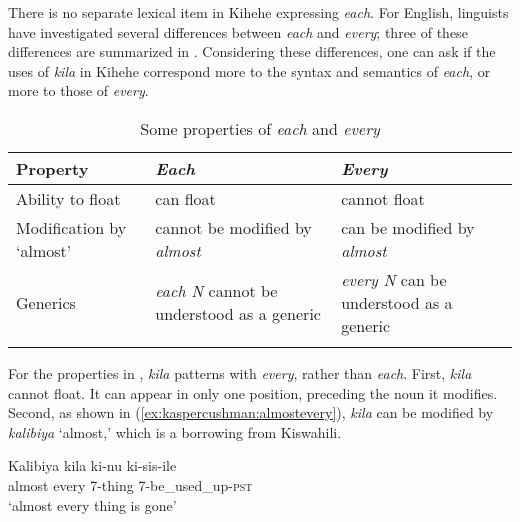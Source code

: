 \documentclass[output=paper,modfonts,nonflat]{langsci/langscibook}
\begin{document}
There is no separate lexical item in Kihehe expressing \textit{each}. For English, linguists have investigated several differences between \textit{each} and \textit{every}; three of these differences are summarized in . Considering these differences, one can ask if the uses of \textit{kila} in Kihehe correspond more to the syntax and semantics of \textit{each}, or more to those of \textit{every}. 

\begin{table}
\small
\caption{Some properties of \emph{each} and \emph{every} \citep{BeghelliStowell1997}}
\label{tab:kaspercushman:everyeach}
\begin{tabularx}{\textwidth}{l@{~~}p{42mm}@{~~}Q@{}}
\lsptoprule
Property                 & \textit{Each}                                                                                            & \textit{Every}                                                                                                 \\ 
\midrule
Ability to float         & can float                                                 & cannot float                                                                                          \\ 
Modification by `almost'  & cannot be modified by \textit{almost}                     & can be modified by \textit{almost}                                                                           \\ 
Generics                 & \textit{each N} cannot be understood as a generic          & \textit{every N} can be understood as a   generic                  \\ 
\lspbottomrule
\end{tabularx}
\end{table}

For the properties in , \textit{kila} patterns with \textit{every}, rather than \textit{each}.  First, \textit{kila} cannot float. It can appear in only one position, preceding the noun it modifies. Second, as shown in (\ref{ex:kaspercushman:almostevery}), \textit{kila} can be modified by \textit{kalibiya} `almost,' which is a borrowing from Kiswahili. 

\begin{exe}
\ex 
\gll Kalibiya kila ki-nu ki-sis-ile     \\
almost every 7-thing 7-be\_used\_up-\textsc{pst} \\
\glt `almost every thing is gone' \\ \label{ex:kaspercushman:almostevery}
\end{exe}
\end{document}
